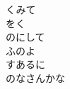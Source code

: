 \documentclass[10pt,b5j]{tarticle} %
\begin{document}
\begin{enumerate}
\begin{minipage}[c]{\blocksize}
        \vspace{\linespace}
        \item
        くみて\\
        をく\\
        のにして\\
        ふのよ\\
        すあるに\\
        のなさんかな
    
    \end{minipage}
\end{enumerate} %
\end{document}
